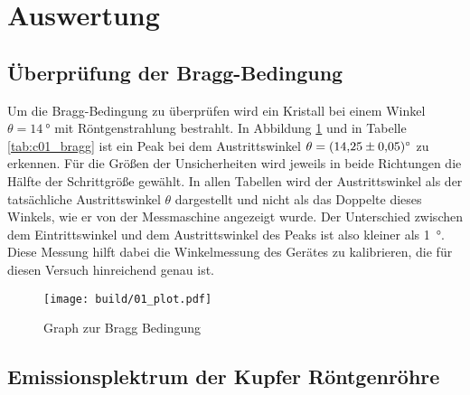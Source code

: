 \section{Auswertung}
\subsection{Überprüfung der Bragg-Bedingung}
Um die Bragg-Bedingung zu überprüfen wird ein Kristall bei einem Winkel $\theta = \qty{14}{\degree}$ mit Röntgenstrahlung bestrahlt.
In Abbildung \ref{fig:01} und in Tabelle \ref{tab:c01_bragg} ist ein Peak bei dem Austrittswinkel $\theta= \qty{14.25+-0.05}{\degree}$
zu erkennen. 
Für die Größen der Unsicherheiten wird jeweils in beide Richtungen die Hälfte der Schrittgröße gewählt.
In allen Tabellen wird der Austrittswinkel als der tatsächliche Austrittswinkel $\theta$ dargestellt und nicht als das 
Doppelte dieses Winkels, wie er von der Messmaschine angezeigt wurde.
Der Unterschied zwischen dem Eintrittswinkel und dem Austrittswinkel des Peaks ist also kleiner als \qty{1}{\degree}.
Diese Messung hilft dabei die Winkelmessung des Gerätes zu kalibrieren, die für diesen Versuch hinreichend genau ist.
\begin{figure}
    \centering
    \texttt{[image: build/01\_plot.pdf]}
    \caption{Graph zur Bragg Bedingung}
    \label{fig:01}
\end{figure}

\subsection{Emissionsplektrum der Kupfer Röntgenröhre}

